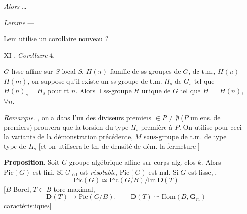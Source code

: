 \documentclass[11pt,a4paper]{article}
\begin{document}

\emph{Alors} …

\emph{Lemme} ---



Lem utilise un corollaire nouveau ?

\marginal{!!}

XI , \emph{Corollaire} 4.\ill{} 

$G$ lisse affine sur $S$ local \ill{} \ill{}  $S$.
\struck{\ill{}} $H(n)$ famille de ss-groupes de $G$, de t.m., $H(n)$ \ill{}
$H(m)$, on suppose qu'il existe un ss-groupe de t.m. $H_s$ de $G_s$
tel que $H(n)_s = H_s$ pour tt $n$. Alors $\exists$ ss-groupe $H$ 
unique de $G$ tel que $H$ \ill{} $= H(n)$, $\forall n$.

\emph{Remarque.}   \ill{}
\ill{} \ill{}, on a dans l'un des diviseurs premiers  $\in
P \neq \emptyset$ ($P$ un ens. de  premiers) prouvera
que la torsion du type $H_s$  première à $P$. On utilise pour
ceci la variante de la démonstration précédente,  $M$
 \ill{} \struck{\ill{}} sous-groupe de t.m. de type
$=$ type de $H_s$ [et on \struck{\ill{}} utilisera le th. de
densité de \ill{} dém. \ill{} la fermeture \ill{}
]


\textbf{Proposition}. Soit $G$ groupe algébrique affine sur corps alg. clos
$k$. Alors $\mathrm{Pic}(G)$ est fini. Si $G_{\mathrm{réd}}$ est
 \emph{résoluble}, 
$\mathrm{Pic}(G)$ est nul. Si $G$ est lisse, \struck{\ill{}} ,
\[
  \mathrm{Pic}(G) \simeq \mathrm{Pic}(G/B)/\mathrm{Im}\, \mathbf{D}(T)
\]
[$B$ Borel, $T \subset B$ tore maximal,
\[
  \mathbf{D}(T) \to \mathrm{Pic}(G/B), \qquad \mathbf{D}(T) \simeq
  \mathrm{Hom}(B, \mathbf{G}_m)
\]
 caractéristiques]
\end{document}
